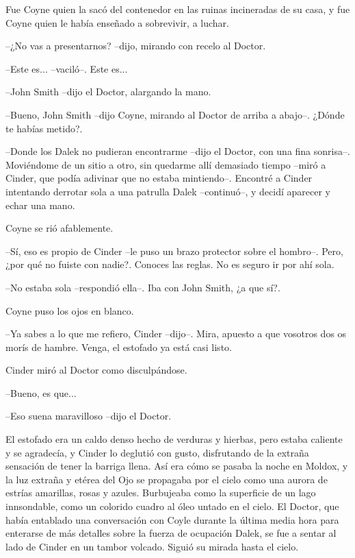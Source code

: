 Fue Coyne quien la sacó del contenedor en las ruinas incineradas de su casa, y fue Coyne quien le había enseñado a sobrevivir, a luchar.

--¿No vas a presentarnos? --dijo, mirando con recelo al Doctor.

--Este es... --vaciló--. Este es...

--John Smith --dijo el Doctor, alargando la mano.

--Bueno, John Smith --dijo Coyne, mirando al Doctor de arriba a abajo--. ¿Dónde te habías metido?.

--Donde los Dalek no pudieran encontrarme --dijo el Doctor, con una fina sonrisa--. Moviéndome de un sitio a otro, sin quedarme allí demasiado tiempo --miró a Cinder, que podía adivinar que no estaba mintiendo--. Encontré a Cinder intentando derrotar sola a una patrulla Dalek --continuó--, y decidí aparecer y echar una mano.

Coyne se rió afablemente.

--Sí, eso es propio de Cinder --le puso un brazo protector sobre el hombro--. Pero, ¿por qué no fuiste con nadie?. Conoces las reglas. No es seguro ir por ahí sola.

--No estaba sola --respondió ella--. Iba con John Smith, ¿a que sí?.

Coyne puso los ojos en blanco.

--Ya sabes a lo que me refiero, Cinder --dijo--. Mira, apuesto a que vosotros dos os morís de hambre. Venga, el estofado ya está casi listo.

Cinder miró al Doctor como disculpándose.

--Bueno, es que...

--Eso suena maravilloso --dijo el Doctor.

\mbox{}

El estofado era un caldo denso hecho de verduras y hierbas, pero estaba caliente y se agradecía, y Cinder lo deglutió con gusto, disfrutando de la extraña sensación de tener la barriga llena.
Así era cómo se pasaba la noche en Moldox, y la luz extraña y etérea del Ojo se propagaba por el cielo como una aurora de estrías amarillas, rosas y azules. Burbujeaba como la superficie de un lago innsondable, como un colorido cuadro al óleo untado en el cielo.
El Doctor, que había entablado una conversación con Coyle durante la última media hora para enterarse de más detalles sobre la fuerza de ocupación Dalek, se fue a sentar al lado de Cinder en un tambor volcado. Siguió su mirada hasta el cielo.

